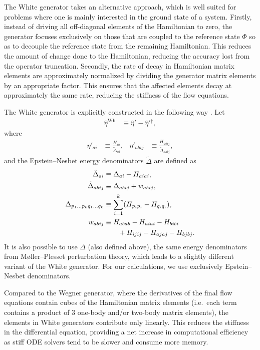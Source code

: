 The White generator takes an alternative approach, which is well suited for problems where one is mainly interested in the ground state of a system.  Firstly, instead of driving all off-diagonal elements of the Hamiltonian to zero, the generator focuses exclusively on those that are coupled to the reference state $\Phi$ so as to decouple the reference state from the remaining Hamiltonian.  This reduces the amount of change done to the Hamiltonian, reducing the accuracy lost from the operator truncation.  Secondly, the rate of decay in Hamiltonian matrix elements are approximately normalized by dividing the generator matrix elements by an appropriate factor.  This ensures that the affected elements decay at approximately the same rate, reducing the stiffness of the flow equations.

The White generator is explicitly constructed in the following way \cite{PhysRevLett.106.222502,White:cond-mat0201346}.  Let
\begin{align*}
\hat{\eta}^{\text{Wh}} &\equiv \hat{\eta}' - \hat{\eta}'{}^\dagger,
\end{align*}
where
\begin{align*}
\eta'_{a i} &\equiv \frac{H_{a i}}{\tilde{\Delta}_{a i}}, &
\eta'_{a b i j} &\equiv \frac{H_{a b i j}}{\tilde{\Delta}_{a b i j}},
\end{align*}
and the Epstein--Nesbet energy denominators $\tilde{\Delta}$ \cite{shavitt2009many} are defined as
\begin{align}
\tilde{\Delta}_{a i} &\equiv \Delta_{a i} - H_{a i a i}, \notag \\
\tilde{\Delta}_{a b i j} &\equiv \Delta_{a b i j} + w_{a b i j}, \notag \\
\Delta_{p_1 \ldots p_k q_1 \ldots q_k} &\equiv \sum_{i = 1}^k (H_{p_i p_i} -  H_{q_i q_i}), \label{eq:moellerplessetdenominator} \\
w_{a b i j}
  &\equiv H_{a b a b} - H_{a i a i} - H_{b i b i} \notag \\
  &\qquad + H_{i j i j} - H_{a j a j} - H_{b j b j}. \notag
\end{align}
It is also possible \cite{IMSRG} to use $\Delta$ (also defined above), the same energy denominators from M\o ller--Plesset perturbation theory, which leads to a slightly different variant of the White generator.  For our calculations, we use exclusively Epstein--Nesbet denominators.

Compared to the Wegner generator, where the derivatives of the final flow equations contain cubes of the Hamiltonian matrix elements (i.e.\ each term contains a product of 3 one-body and/or two-body matrix elements), the elements in White generators contribute only linearly.  This reduces the stiffness in the differential equation, providing a net increase in computational efficiency as stiff ODE solvers tend to be slower and consume more memory.

